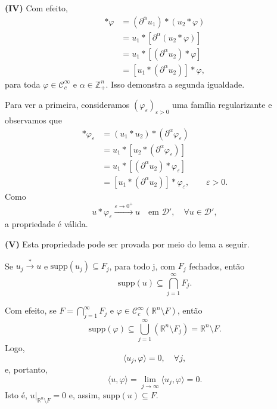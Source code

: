 \documentclass[../distribution_theory_notes.tex]{subfiles}
\begin{document}
\begin{proof*}
	\textbf{(IV)} Com efeito,
	\begin{align*}
		[(\partial^{\alpha}u_{1})*u_{2}]*\varphi
		 & =(\partial^{\alpha}u_{1})*(u_{2}*\varphi)  \\
		 & =u_{1}*[\partial^{\alpha}(u_{2}*\varphi)]  \\
		 & =u_{1}*[(\partial^{\alpha}u_{2})*\varphi]  \\
		 & =[u_{1}*(\partial^{\alpha}u_{2})]*\varphi,
	\end{align*}
	para toda \(\varphi\in \mathcal{C}_{c}^{\infty}\) e \(\alpha\in \mathbb{Z}_{+}^{n}\). Isso demonstra a segunda igualdade.

	Para ver a primeira, consideramos \((\varphi_{\varepsilon})_{\varepsilon>0}\) uma família regularizante e observamos que
	\begin{align*}
		[\partial^{\alpha}(u_{1}*u_{2})]*\varphi_{\varepsilon}
		 & =(u_{1}*u_{2})*(\partial^{\alpha}\varphi_{\varepsilon})  \\
		 & =u_{1}*[u_{2}*(\partial^{\alpha}\varphi_{\varepsilon})]  \\
		 & =u_{1}*[(\partial^{\alpha}u_{2})*\varphi_{\varepsilon}]  \\
		 & =[u_{1}*(\partial^{\alpha}u_{2})]*\varphi_{\varepsilon},
		\qquad \varepsilon>0.
	\end{align*}
	Como
	\[
		u*\varphi_{\varepsilon}
		\stackrel{\varepsilon\to0^{+}}{\longrightarrow}u
		\quad\text{em }\mathcal{D}',
		\quad \forall u\in \mathcal{D}',
	\]
	a propriedade é válida.

	\textbf{(V)} Esta propriedade pode ser provada por meio do lema a seguir.

	\begin{lemma*}
		Se \(u_{j}\stackrel{*}{\longrightarrow}u\) e \(\mathrm{supp}(u_{j})\subseteq F_{j}\), para todo j, com \(F_{j}\) fechados, então
		\[
			\mathrm{supp}(u)\subseteq \bigcap_{j=1}^{\infty}F_{j}.
		\]
	\end{lemma*}
	\begin{proof*}
		Com efeito, se \(F=\bigcap_{j=1}^{\infty}F_{j}\) e \(\varphi\in \mathcal{C}_{c}^{\infty}(\mathbb{R}^{n}\setminus F)\), então
		\[
			\mathrm{supp}(\varphi)
			\subseteq \bigcup_{j=1}^{\infty}(\mathbb{R}^{n}\setminus F_{j})
			=\mathbb{R}^{n}\setminus F.
		\]
		Logo,
		\[
			\langle u_{j},\varphi\rangle=0,\quad \forall j,
		\]
		e, portanto,
		\[
			\langle u,\varphi\rangle
			=\lim_{j\to\infty}\langle u_{j},\varphi\rangle=0.
		\]
		Isto é, \(u|_{\mathbb{R}^{n}\setminus F}=0\) e, assim, \(\mathrm{supp}(u)\subseteq F\). \qedsymbol
	\end{proof*}


\end{proof*}
\end{document}
